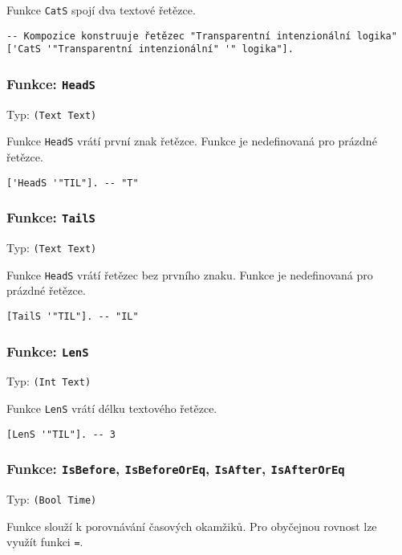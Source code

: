 Funkce \lstinline{CatS} spojí dva textové řetězce.

\begin{lstlisting}[caption={Ukázka využití Char}]
-- Kompozice konstruuje řetězec "Transparentní intenzionální logika"
['CatS '"Transparentní intenzionální" '" logika"].
\end{lstlisting}

\subsubsection*{Funkce: \lstinline{HeadS}}
Typ: \lstinline{(Text Text)}

Funkce \lstinline{HeadS} vrátí první znak řetězce. Funkce je nedefinovaná pro prázdné řetězce.

\begin{lstlisting}[caption={Ukázka využití HeadS}]
['HeadS '"TIL"]. -- "T"
\end{lstlisting}

\subsubsection*{Funkce: \lstinline{TailS}}
Typ: \lstinline{(Text Text)}

Funkce \lstinline{HeadS} vrátí řetězec bez prvního znaku. Funkce je nedefinovaná pro prázdné
řetězce.

\begin{lstlisting}[caption={Ukázka využití TailS}]
[TailS '"TIL"]. -- "IL"
\end{lstlisting}

\subsubsection*{Funkce: \lstinline{LenS}}
Typ: \lstinline{(Int Text)}

Funkce \lstinline{LenS} vrátí délku textového řetězce.

\begin{lstlisting}[caption={Ukázka využití LenS}]
[LenS '"TIL"]. -- 3
\end{lstlisting}

\subsubsection*{Funkce: \lstinline{IsBefore}, \lstinline{IsBeforeOrEq}, \lstinline{IsAfter},
  \lstinline{IsAfterOrEq}}
Typ: \lstinline{(Bool Time)}

Funkce slouží k porovnávání časových okamžiků. Pro obyčejnou rovnost lze využít funkci
\lstinline{=}.

